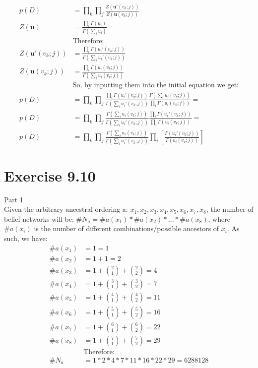 \documentclass[11pt,a4paper,oneside]{report}
\begin{document}
\begin{align*}
p(D)&=\prod_k\prod_j\frac{Z(\mathbf{u'}(v_k;j))}{Z(\mathbf{u}(v_k;j))}\\
Z(\mathbf{u})&=\frac{\prod_i\Gamma(u_i)}{\Gamma(\sum_iu_i)}\\
&\text{Therefore:}\\
Z(\mathbf{u'}(v_k;j))&=\frac{\prod_i\Gamma(u_i'(v_k;j))}{\Gamma(\sum_iu_i'(v_k;j))}\\
Z(\mathbf{u}(v_k;j))&=\frac{\prod_i\Gamma(u_i(v_k;j))}{\Gamma(\sum_iu_i(v_k;j))}\\
&\text{So, by inputting them into the initial equation we get:}\\
p(D)&=\prod_k\prod_j\frac{\prod_i\Gamma(u_i'(v_k;j))}{\Gamma(\sum_iu_i'(v_k;j))}\frac{\Gamma(\sum_iu_i(v_k;j))}{\prod_i\Gamma(u_i(v_k;j))}=\\
p(D)&=\prod_k\prod_j\frac{\Gamma(\sum_iu_i(v_k;j))}{\Gamma(\sum_iu_i'(v_k;j))}\frac{\prod_i\Gamma(u_i'(v_k;j))}{\prod_i\Gamma(u_i(v_k;j))}=\\
p(D)&=\prod_k\prod_j\frac{\Gamma(\sum_iu_i(v_k;j))}{\Gamma(\sum_iu_i'(v_k;j))}\prod_i\left[\frac{\Gamma(u_i'(v_k;j))}{\Gamma(u_i(v_k;j))}\right]
\end{align*}

\section*{Exercise 9.10}

Part 1\\
Given the arbitrary ancestral ordering a: $x_1,x_2,x_3,x_4,x_5,x_6,x_7,x_8$, the number of belief networks will be: $\#N_a=\#a(x_1)*\#a(x_2)*...*\#a(x_8)$, where $\#a(x_i)$ is the number of different combinations/possible ancestors of $x_i$. As such, we have:
\begin{align*}
\#a(x_1)&=1=1\\
\#a(x_2)&=1+1=2\\
\#a(x_3)&=1+\binom 21 +\binom 22=4\\
\#a(x_4)&=1+\binom 31 +\binom 32=7\\
\#a(x_5)&=1+\binom 41 +\binom 42=11\\
\#a(x_6)&=1+\binom 51 +\binom 52=16\\
\#a(x_7)&=1+\binom 61 +\binom 62=22\\
\#a(x_8)&=1+\binom 71 +\binom 72=29\\
&\text{Therefore:}\\
\#N_a&=1*2*4*7*11*16*22*29=6288128
\end{align*}
\end{document}
